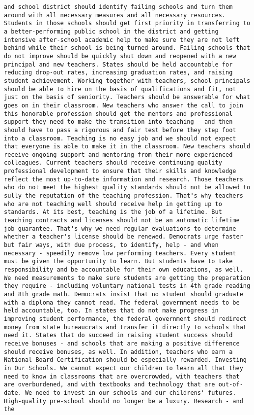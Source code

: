\documentclass[
]{article}
\begin{document}
\begin{verbatim}
and school district should identify failing schools and turn them around with all necessary measures and all necessary resources. Students in those schools should get first priority in transferring to a better-performing public school in the district and getting intensive after-school academic help to make sure they are not left behind while their school is being turned around. Failing schools that do not improve should be quickly shut down and reopened with a new principal and new teachers. States should be held accountable for reducing drop-out rates, increasing graduation rates, and raising student achievement. Working together with teachers, school principals should be able to hire on the basis of qualifications and fit, not just on the basis of seniority. Teachers should be answerable for what goes on in their classroom. New teachers who answer the call to join this honorable profession should get the mentors and professional support they need to make the transition into teaching - and then should have to pass a rigorous and fair test before they step foot into a classroom. Teaching is no easy job and we should not expect that everyone is able to make it in the classroom. New teachers should receive ongoing support and mentoring from their more experienced colleagues. Current teachers should receive continuing quality professional development to ensure that their skills and knowledge reflect the most up-to-date information and research. Those teachers who do not meet the highest quality standards should not be allowed to sully the reputation of the teaching profession. That's why teachers who are not teaching well should receive help in getting up to standards. At its best, teaching is the job of a lifetime. But teaching contracts and licenses should not be an automatic lifetime job guarantee. That's why we need regular evaluations to determine whether a teacher's license should be renewed. Democrats urge faster but fair ways, with due process, to identify, help - and when necessary - speedily remove low performing teachers. Every student must be given the opportunity to learn. But students have to take responsibility and be accountable for their own educations, as well. We need measurements to make sure students are getting the preparation they require - including voluntary national tests in 4th grade reading and 8th grade math. Democrats insist that no student should graduate with a diploma they cannot read. The federal government needs to be held accountable, too. In states that do not make progress in improving student performance, the federal government should redirect money from state bureaucrats and transfer it directly to schools that need it. States that do succeed in raising student success should receive bonuses - and schools that are making a positive difference should receive bonuses, as well. In addition, teachers who earn a National Board Certification should be especially rewarded. Investing in Our Schools. We cannot expect our children to learn all that they need to know in classrooms that are overcrowded, with teachers that are overburdened, and with textbooks and technology that are out-of-date. We need to invest in our schools and our childrens' futures. High-quality pre-school should no longer be a luxury. Research - and the 
\end{verbatim}
\end{document}
